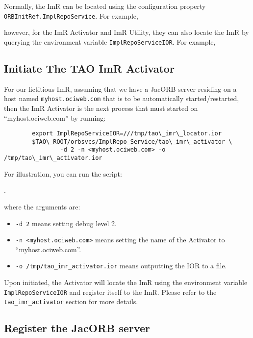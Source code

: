 Normally, the ImR can be located using the configuration  property
{\tt ORBInitRef.ImplRepoService}.  For example,


however, for the ImR Activator and ImR Utility,  they can also locate
the ImR by querying the environment variable {\tt ImplRepoServiceIOR}.
For example,


\subsection{Initiate The TAO ImR Activator}

For our fictitious ImR, assuming that we have a JacORB server residing
on a host named {\tt myhost.ociweb.com} that is to be automatically started/restarted,
then the ImR Activator is the next process that must started on
“myhost.ociweb.com” by running:

\begin{verbatim}
        export ImplRepoServiceIOR=///tmp/tao\_imr\_locator.ior
        $TAO\_ROOT/orbsvcs/ImplRepo_Service/tao\_imr\_activator \
                -d 2 -n <myhost.ociweb.com> -o /tmp/tao\_imr\_activator.ior
\end{verbatim}

For illustration, you can run the script:

.

where the arguments are:
\begin{itemize}
    \item {\tt -d 2} means setting debug level 2.
    \item {\tt -n <myhost.ociweb.com>} means setting the name of the Activator to
              “myhost.ociweb.com”.
    \item {\tt -o /tmp/tao\_imr\_activator.ior} means outputting the IOR to a file.
\end{itemize}


Upon initiated, the Activator will locate the ImR using the environment
variable {\tt ImplRepoServiceIOR} and register itself to the ImR.  Please
refer to the {\tt tao\_imr\_activator} section for more details.

\subsection{Register the JacORB server}

